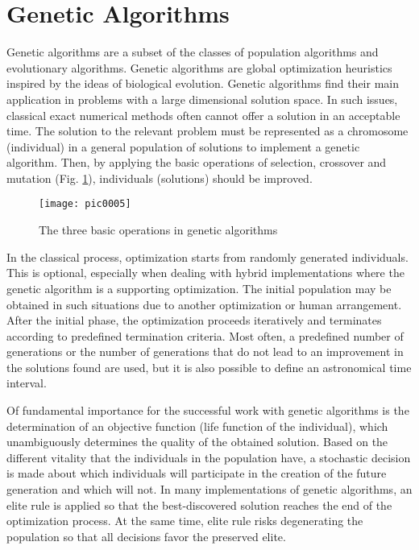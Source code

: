\section{Genetic Algorithms}

Genetic algorithms are a subset of the classes of population algorithms and evolutionary algorithms. Genetic algorithms are global optimization heuristics inspired by the ideas of biological evolution. Genetic algorithms find their main application in problems with a large dimensional solution space. In such issues, classical exact numerical methods often cannot offer a solution in an acceptable time. The solution to the relevant problem must be represented as a chromosome (individual) in a general population of solutions to implement a genetic algorithm. Then, by applying the basic operations of selection, crossover and mutation (Fig. \ref{fig:pic0005}), individuals (solutions) should be improved.

\begin{figure}[h]
\centering
\texttt{[image: pic0005]}
\caption{The three basic operations in genetic algorithms}
\label{fig:pic0005}
\end{figure}

In the classical process, optimization starts from randomly generated individuals. This is optional, especially when dealing with hybrid implementations where the genetic algorithm is a supporting optimization. The initial population may be obtained in such situations due to another optimization or human arrangement. After the initial phase, the optimization proceeds iteratively and terminates according to predefined termination criteria. Most often, a predefined number of generations or the number of generations that do not lead to an improvement in the solutions found are used, but it is also possible to define an astronomical time interval.

Of fundamental importance for the successful work with genetic algorithms is the determination of an objective function (life function of the individual), which unambiguously determines the quality of the obtained solution. Based on the different vitality that the individuals in the population have, a stochastic decision is made about which individuals will participate in the creation of the future generation and which will not. In many implementations of genetic algorithms, an elite rule is applied so that the best-discovered solution reaches the end of the optimization process. At the same time, elite rule risks degenerating the population so that all decisions favor the preserved elite.

